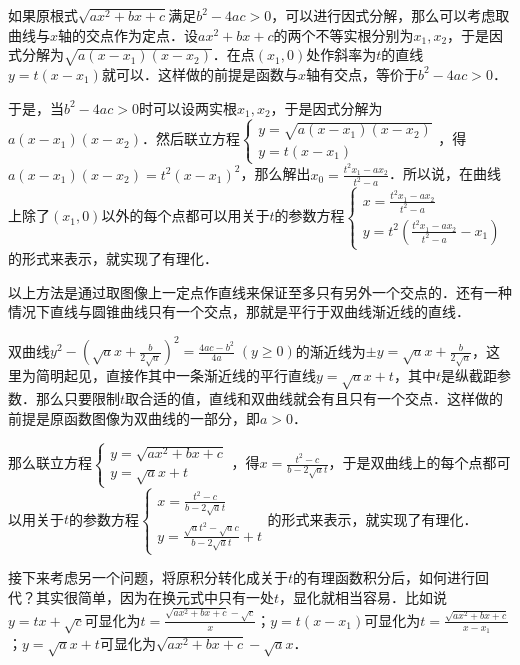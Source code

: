 \documentclass{ctexbook}
\begin{document}
如果原根式$\sqrt{ax^{2}+bx+c}$满足$b^{2}-4ac>0$，可以进行因式分解，那么可以考虑取曲线与$x$轴的交点作为定点．设$ax^{2}+bx+c$的两个不等实根分别为$x_{1},x_{2}$，于是因式分解为$\sqrt{a\left(x-x_{1}\right)\left(x-x_{2}\right)}$．在点$\left(x_{1},0\right)$处作斜率为$t$的直线$y=t\left(x-x_{1}\right)$就可以．这样做的前提是函数与$x$轴有交点，等价于$b^{2}-4ac>0$．\par
于是，当$b^{2}-4ac>0$时可以设两实根$x_{1},x_{2}$，于是因式分解为$a\left(x-x_{1}\right)\left(x-x_{2}\right)$．然后联立方程$\begin{cases}y=\sqrt{a\left(x-x_{1}\right)\left(x-x_{2}\right)}\\y=t\left(x-x_{1}\right)\end{cases}$，得$a\left(x-x_{1}\right)\left(x-x_{2}\right)=t^{2}\left(x-x_{1}\right)^{2}$，那么解出$x_{0}=\frac{t^{2}x_{1}-ax_{2}}{t^{2}-a}$．所以说，在曲线上除了$\left(x_{1},0\right)$以外的每个点都可以用关于$t$的参数方程$\begin{cases}x=\frac{t^{2}x_{1}-ax_{2}}{t^{2}-a}\\y=t^{2}\left(\frac{t^{2}x_{1}-ax_{2}}{t^{2}-a}-x_{1}\right)\end{cases}$的形式来表示，就实现了有理化．\par
以上方法是通过取图像上一定点作直线来保证至多只有另外一个交点的．还有一种情况下直线与圆锥曲线只有一个交点，那就是平行于双曲线渐近线的直线．\par
双曲线$y^{2}-\left(\sqrt{a}x+\frac{b}{2\sqrt{a}}\right)^{2}=\frac{4ac-b^{2}}{4a}\;\left(y\ge0\right)$的渐近线为$\pm y=\sqrt{a}x+\frac{b}{2\sqrt{a}}$，这里为简明起见，直接作其中一条渐近线的平行直线$y=\sqrt{a}x+t$，其中$t$是纵截距参数．那么只要限制$t$取合适的值，直线和双曲线就会有且只有一个交点．这样做的前提是原函数图像为双曲线的一部分，即$a>0$．\par
那么联立方程$\begin{cases}y=\sqrt{ax^{2}+bx+c}\\y=\sqrt{a}x+t\end{cases}$，得$x=\frac{t^{2}-c}{b-2\sqrt{a}t}$，于是双曲线上的每个点都可以用关于$t$的参数方程$\begin{cases}x=\frac{t^{2}-c}{b-2\sqrt{a}t}\\y=\frac{\sqrt{a}t^{2}-\sqrt{a}c}{b-2\sqrt{a}t}+t\end{cases}$的形式来表示，就实现了有理化．\par
接下来考虑另一个问题，将原积分转化成关于$t$的有理函数积分后，如何进行回代？其实很简单，因为在换元式中只有一处$t$，显化就相当容易．比如说$y=tx+\sqrt{c}$可显化为$t=\frac{\sqrt{ax^{2}+bx+c}-\sqrt{c}}{x}$；$y=t\left(x-x_{1}\right)$可显化为$t=\frac{\sqrt{ax^{2}+bx+c}}{x-x_{1}}$；$y=\sqrt{a}x+t$可显化为$\sqrt{ax^{2}+bx+c}-\sqrt{a}x$．\par
\end{document}
